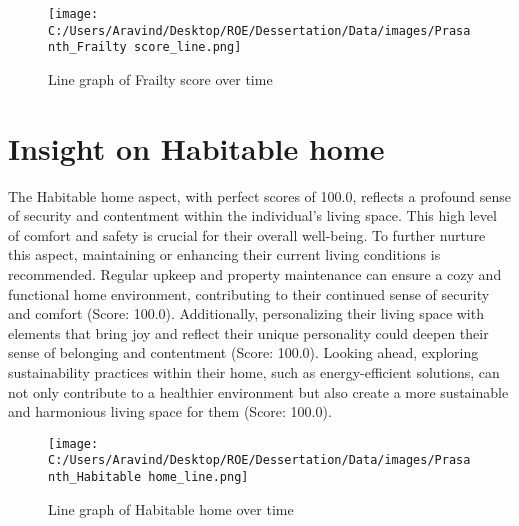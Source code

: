 \documentclass[10pt, a4paper]{article}%
\begin{document}
\begin{figure}[H]%
\centering%
\texttt{[image: C:/Users/Aravind/Desktop/ROE/Dessertation/Data/images/Prasanth\_Frailty score\_line.png]}%
\caption{Line graph of Frailty score over time}%
\end{figure}

%
\section{Insight on Habitable home}%
\label{sec:InsightonHabitablehome}%
The Habitable home aspect, with perfect scores of 100.0, reflects a profound sense of security and contentment within the individual's living space. This high level of comfort and safety is crucial for their overall well{-}being. To further nurture this aspect, maintaining or enhancing their current living conditions is recommended. Regular upkeep and property maintenance can ensure a cozy and functional home environment, contributing to their continued sense of security and comfort (Score: 100.0). Additionally, personalizing their living space with elements that bring joy and reflect their unique personality could deepen their sense of belonging and contentment (Score: 100.0). Looking ahead, exploring sustainability practices within their home, such as energy{-}efficient solutions, can not only contribute to a healthier environment but also create a more sustainable and harmonious living space for them (Score: 100.0).%


\begin{figure}[H]%
\centering%
\texttt{[image: C:/Users/Aravind/Desktop/ROE/Dessertation/Data/images/Prasanth\_Habitable home\_line.png]}%
\caption{Line graph of Habitable home over time}%
\end{figure}

%
\end{document}
